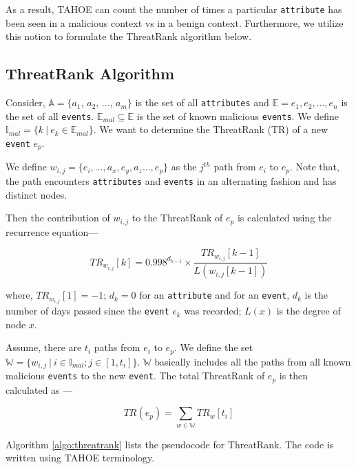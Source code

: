 As a result, TAHOE can count the number of times a particular \texttt{attribute} has been seen in a malicious context vs in a benign context. Furthermore, we utilize this notion to formulate the ThreatRank algorithm below.


\subsection{ThreatRank Algorithm}

\fi

Consider, $\mathbb{A} = \{a_1$, $a_2$, ..., $a_m\}$ is the set of all \texttt{attributes} and $\mathbb E = {e_1, e_2, ..., e_n}$ is the set of all \texttt{events}. $\mathbb E_{mal} \subseteq \mathbb E$ is the set of known malicious \texttt{events}. We define $\mathbb I_{mal} = \{k ~ | ~ e_k \in \mathbb E_{mal}\}$. We want to determine the ThreatRank (TR) of a new \texttt{event} $e_p$.

We define $w_{i,j} = \{e_i, ..., a_x, e_y, a_z ..., e_p\}$ as the $j^{th}$ path from $e_i$ to $e_p$. Note that, the path encounters \texttt{attributes} and \texttt{events} in an alternating fashion and has distinct nodes.

Then the contribution of $w_{i,j}$ to the ThreatRank of $e_p$ is calculated using the recurrence equation---

\begin{equation}\label{eq:trwij}
	TR_{w_{i,j}}[k] = 0.998^{d_{k-1}}  \times \frac{ TR_{w_{i,j}}[k-1] }{L( w_{i,j}[k-1] )}
\end{equation}

where, $TR_{w_{i,j}}[1] = -1$; $d_k = 0$ for an \texttt{attribute} and for an \texttt{event}, $d_k$ is the number of days passed since the \texttt{event} $e_k$ was recorded; $L(x)$ is the degree of node $x$.

Assume, there are $t_i$ paths from $e_i$ to $e_p$. We define the set $\mathbb W = \{w_{i,j} ~ | ~ i \in \mathbb I_{mal}; j \in [1,t_i]\}$. $\mathbb W$ basically includes all the paths from all known malicious \texttt{events} to the new \texttt{event}. The total ThreatRank of $e_p$ is then calculated as ---

\begin{equation}\label{eq:trep}
	TR(e_p) = \sum_{w \in \mathbb W} TR_{w}[t_i]
\end{equation}

Algorithm \ref{algo:threatrank} lists the pseudocode for ThreatRank. The code is written using TAHOE terminology.



